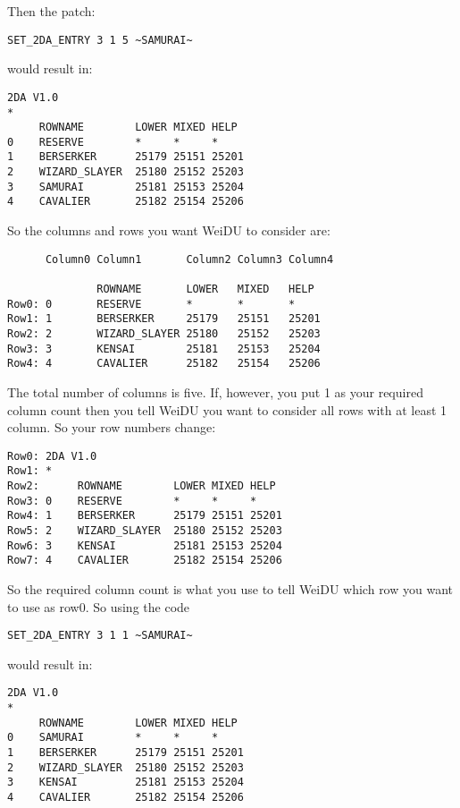 \documentclass{article}
\begin{document}
Then the patch:

\begin{verbatim}
SET_2DA_ENTRY 3 1 5 ~SAMURAI~
\end{verbatim}

would result in:

\begin{verbatim}
2DA V1.0
*
     ROWNAME        LOWER MIXED HELP
0    RESERVE        *     *     *
1    BERSERKER      25179 25151 25201
2    WIZARD_SLAYER  25180 25152 25203
3    SAMURAI        25181 25153 25204
4    CAVALIER       25182 25154 25206
\end{verbatim}

So the columns and rows you want WeiDU to consider are:

\begin{verbatim}
      Column0 Column1       Column2 Column3 Column4

              ROWNAME       LOWER   MIXED   HELP
Row0: 0       RESERVE       *       *       *
Row1: 1       BERSERKER     25179   25151   25201
Row2: 2       WIZARD_SLAYER 25180   25152   25203
Row3: 3       KENSAI        25181   25153   25204
Row4: 4       CAVALIER      25182   25154   25206
\end{verbatim}

The total number of columns is five. If, however, you put 1 as your
required column count then you tell WeiDU you want to consider all rows
with at least 1 column. So your row numbers change:

\begin{verbatim}
Row0: 2DA V1.0
Row1: *
Row2:      ROWNAME        LOWER MIXED HELP
Row3: 0    RESERVE        *     *     *
Row4: 1    BERSERKER      25179 25151 25201
Row5: 2    WIZARD_SLAYER  25180 25152 25203
Row6: 3    KENSAI         25181 25153 25204
Row7: 4    CAVALIER       25182 25154 25206
\end{verbatim}

So the required column count is what you use to tell WeiDU which row you
want to use as row0. So using the code
\begin{verbatim}
SET_2DA_ENTRY 3 1 1 ~SAMURAI~
\end{verbatim}
would result in:

\begin{verbatim}
2DA V1.0
*
     ROWNAME        LOWER MIXED HELP
0    SAMURAI        *     *     *
1    BERSERKER      25179 25151 25201
2    WIZARD_SLAYER  25180 25152 25203
3    KENSAI         25181 25153 25204
4    CAVALIER       25182 25154 25206
\end{verbatim}
\end{document}
